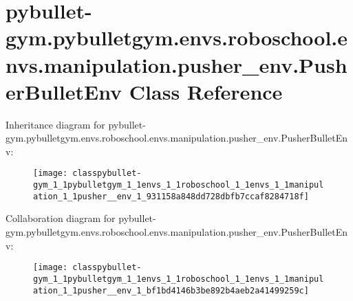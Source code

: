 \hypertarget{classpybullet-gym_1_1pybulletgym_1_1envs_1_1roboschool_1_1envs_1_1manipulation_1_1pusher__env_1_1_pusher_bullet_env}{}\section{pybullet-\/gym.pybulletgym.\+envs.\+roboschool.\+envs.\+manipulation.\+pusher\+\_\+env.\+Pusher\+Bullet\+Env Class Reference}
\label{classpybullet-gym_1_1pybulletgym_1_1envs_1_1roboschool_1_1envs_1_1manipulation_1_1pusher__env_1_1_pusher_bullet_env}


Inheritance diagram for pybullet-\/gym.pybulletgym.\+envs.\+roboschool.\+envs.\+manipulation.\+pusher\+\_\+env.\+Pusher\+Bullet\+Env\+:
\nopagebreak
\begin{figure}[H]
\begin{center}
\leavevmode
\texttt{[image: classpybullet-gym\_1\_1pybulletgym\_1\_1envs\_1\_1roboschool\_1\_1envs\_1\_1manipulation\_1\_1pusher\_\_env\_1\_931158a848dd728dbfb7ccaf8284718f]}
\end{center}
\end{figure}


Collaboration diagram for pybullet-\/gym.pybulletgym.\+envs.\+roboschool.\+envs.\+manipulation.\+pusher\+\_\+env.\+Pusher\+Bullet\+Env\+:
\nopagebreak
\begin{figure}[H]
\begin{center}
\leavevmode
\texttt{[image: classpybullet-gym\_1\_1pybulletgym\_1\_1envs\_1\_1roboschool\_1\_1envs\_1\_1manipulation\_1\_1pusher\_\_env\_1\_bf1bd4146b3be892b4aeb2a41499259c]}
\end{center}
\end{figure}
